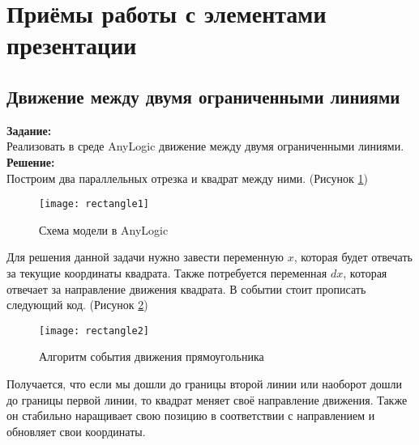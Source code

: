 \section*{Приёмы работы с элементами презентации}
\subsection*{Движение между двумя ограниченными линиями}

\textbf{Задание:}\\
Реализовать в среде AnyLogic движение между двумя ограниченными линиями.\\

\textbf{Решение:}\\
Построим два параллельных отрезка и квадрат между ними. (Рисунок \ref{fig:rectangle1})
\begin{figure}[h]
	\centering \texttt{[image: rectangle1]}
	\caption{Схема модели в AnyLogic}
	\label{fig:rectangle1}
\end{figure}

Для решения данной задачи нужно завести переменную $x$, которая будет отвечать за текущие координаты квадрата. Также потребуется переменная $dx$, которая отвечает за направление движения квадрата. В событии стоит прописать следующий код. (Рисунок \ref{fig:rectangle2})
\begin{figure}[h]
	\centering \texttt{[image: rectangle2]}
	\caption{Алгоритм события движения прямоугольника}
	\label{fig:rectangle2}
\end{figure}

Получается, что если мы дошли до границы второй линии или наоборот дошли до границы первой линии, то квадрат меняет своё направление движения. Также он стабильно наращивает свою позицию в соответствии с направлением и обновляет свои координаты.